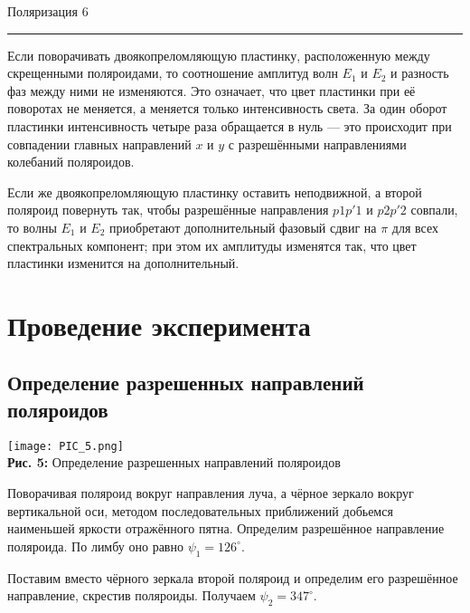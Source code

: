 \documentclass[12pt,a4paper]{scrartcl}
\begin{document}
	\newpage
	
	
	\begin{flushleft}
		\footnotesize{Поляризация} \hspace{\fill} \footnotesize{6}
		\\[-0.3cm]\noindent\rule{\textwidth}{0.3pt}
	\end{flushleft}
	
	Если поворачивать двоякопреломляющую пластинку, расположенную между
	скрещенными поляроидами, то соотношение амплитуд волн $ E_1 $ и $ E_2 $ и разность фаз между ними не изменяются. Это означает, что цвет пластинки при её поворотах не меняется, а меняется только интенсивность света. За один оборот пластинки интенсивность четыре раза обращается в нуль --- это происходит при совпадении главных направлений
	$ x $ и $ y $ с разрешёнными направлениями колебаний поляроидов.
	
	Если же двоякопреломляющую пластинку оставить неподвижной, а
	второй поляроид повернуть так, чтобы разрешённые направления $ p1p'1 $
	и $ p2p'2 $ совпали, то волны $ E_1 $ и $ E_2 $ приобретают дополнительный фазовый сдвиг на $ \pi $ для всех спектральных компонент; при этом их амплитуды изменятся так, что цвет пластинки изменится на дополнительный. 
	
	\section{Проведение эксперимента}
	
	\subsection{Определение разрешенных направлений поляроидов}
	
	\begin{center}
		\texttt{[image: PIC\_5.png]}
		\\\textbf{Рис. 5:} Определение разрешенных направлений поляроидов
	\end{center}
	
	Поворачивая поляроид вокруг направления луча, а чёрное зеркало вокруг вертикальной оси, методом последовательных приближений добьемся
	наименьшей яркости отражённого пятна. Определим разрешённое направление поляроида. По лимбу оно равно $ \psi_1 = 126^\circ $. 
	
	Поставим вместо чёрного зеркала второй поляроид и определим
	его разрешённое направление, скрестив поляроиды. Получаем $ \psi_2 = 347^\circ $. 
	
\end{document}

